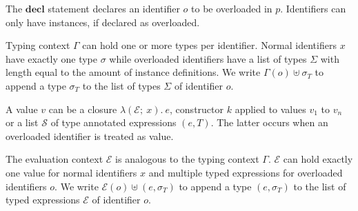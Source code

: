 \documentclass[runningheads]{llncs}
\begin{document}
The $\textbf{decl}$ statement declares an identifier $o$ to be overloaded in $p$. 
Identifiers can only have instances, if declared as overloaded.

Typing context $\Gamma$ can hold one or more types per identifier. 
Normal identifiers $x$ have exactly one type $\sigma$ while overloaded identifiers have a list of types $\Sigma$ with length equal to the amount of instance definitions. 
We write $\Gamma(o) \uplus \sigma_T$ to append a type $\sigma_T$ to the list of types $\Sigma$ of identifier $o$.

A value $v$ can be a closure $\lambda (\mathcal{E}; \ x). \ e$, constructor $k$ applied to values $v_1$ to $v_n$ or a list $\mathcal{S}$ of type annotated expressions $(e, T)$. The latter occurs when an overloaded identifier is treated as value. 

The evaluation context $\mathcal{E}$ is analogous to the typing context $\Gamma$. 
$\mathcal{E}$ can hold exactly one value for normal identifiers $x$ and multiple typed expressions for overloaded identifiers $o$. 
We write $\mathcal{E}(o) \uplus (e, \sigma_T)$ to append a type $(e, \sigma_T)$ to the list of typed expressions $\mathcal{E}$ of identifier $o$.
\end{document}
